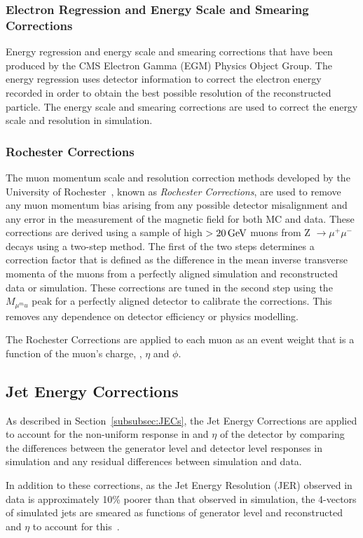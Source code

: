 \subsubsection{Electron Regression and Energy Scale and Smearing Corrections}
Energy regression and energy scale and smearing corrections that have been produced by the CMS Electron Gamma (EGM) Physics Object Group.
The energy regression uses detector information to correct the electron energy recorded in order to obtain the best possible resolution of the reconstructed particle.
The energy scale and smearing corrections are used to correct the energy scale and resolution in simulation.

\subsubsection{Rochester Corrections}
The muon momentum scale and resolution correction methods developed by the University of Rochester~\cite{rochester}, known as \emph{Rochester Corrections}, are used to remove any muon momentum bias arising from any possible detector misalignment and any error in the measurement of the magnetic field for both MC and data.
These corrections are derived using a sample of high \pt $> 20\,\text{Ge\hspace{-.08em}V}$ muons from Z $ \rightarrow \mu^{+}\mu^{-}$ decays using a two-step method.
The first of the two steps determines a correction factor that is defined as the difference in the mean inverse transverse momenta of the muons from a perfectly aligned simulation and reconstructed data or simulation.
These corrections are tuned in the second step using the $M_{\mu^mu}$ peak for a perfectly aligned detector to calibrate the corrections.
This removes any dependence on detector efficiency or physics modelling.

The Rochester Corrections are applied to each muon as an event weight that is a function of the muon's charge, \pt, $\eta$ and $\phi$.

\subsection{Jet Energy Corrections}\label{subsec:jesjer}
As described in Section~\ref{subsubsec:JECs}, the Jet Energy Corrections are applied to account for the non-uniform response in \pT and $\eta$ of the detector by comparing the differences between the generator level and detector level responses in simulation and any residual differences between simulation and data.

In addition to these corrections, as the Jet Energy Resolution (JER) observed in data is approximately 10\% poorer than that observed in simulation, the 4-vectors of simulated jets are smeared as functions of generator level and reconstructed \pt and $\eta$ to account for this~\cite{Khachatryan:2016kdb}.

